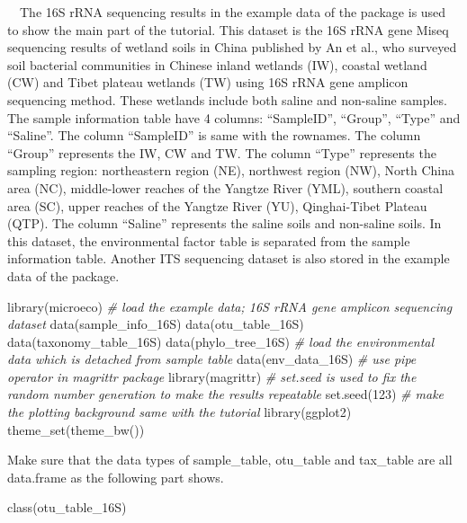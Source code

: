 \documentclass[
]{book}
\newenvironment{Shaded}{\begin{snugshade}}{\end{snugshade}}
\newcommand{\CommentTok}[1]{\textcolor[rgb]{0.56,0.35,0.01}{\textit{#1}}}
\newcommand{\DecValTok}[1]{\textcolor[rgb]{0.00,0.00,0.81}{#1}}
\newcommand{\FunctionTok}[1]{\textcolor[rgb]{0.00,0.00,0.00}{#1}}
\newcommand{\NormalTok}[1]{#1}
\begin{document}
　The 16S rRNA sequencing results in the example data of the package is used to show the main part of the tutorial.
This dataset is the 16S rRNA gene Miseq sequencing results of wetland soils in China published by An et al.\citep{An_Soil_2019},
who surveyed soil bacterial communities in Chinese inland wetlands (IW),
coastal wetland (CW) and Tibet plateau wetlands (TW) using 16S rRNA gene amplicon sequencing method.
These wetlands include both saline and non-saline samples.
The sample information table have 4 columns: ``SampleID'', ``Group'', ``Type'' and ``Saline''.
The column ``SampleID'' is same with the rownames.
The column ``Group'' represents the IW, CW and TW.
The column ``Type'' represents the sampling region: northeastern region (NE), northwest region (NW), North China area (NC),
middle-lower reaches of the Yangtze River (YML), southern coastal area (SC), upper reaches of the Yangtze River (YU), Qinghai-Tibet Plateau (QTP).
The column ``Saline'' represents the saline soils and non-saline soils.
In this dataset, the environmental factor table is separated from the sample information table.
Another ITS sequencing dataset is also stored in the example data of the package\citep{Gao_Strong_2019}.

\begin{Shaded}
\begin{Highlighting}[]
\FunctionTok{library}\NormalTok{(microeco)}
\CommentTok{\# load the example data; 16S rRNA gene amplicon sequencing dataset}
\FunctionTok{data}\NormalTok{(sample\_info\_16S)}
\FunctionTok{data}\NormalTok{(otu\_table\_16S)}
\FunctionTok{data}\NormalTok{(taxonomy\_table\_16S)}
\FunctionTok{data}\NormalTok{(phylo\_tree\_16S)}
\CommentTok{\# load the environmental data which is detached from sample table}
\FunctionTok{data}\NormalTok{(env\_data\_16S)}
\CommentTok{\# use pipe operator in magrittr package}
\FunctionTok{library}\NormalTok{(magrittr)}
\CommentTok{\# set.seed is used to fix the random number generation to make the results repeatable}
\FunctionTok{set.seed}\NormalTok{(}\DecValTok{123}\NormalTok{)}
\CommentTok{\# make the plotting background same with the tutorial}
\FunctionTok{library}\NormalTok{(ggplot2)}
\FunctionTok{theme\_set}\NormalTok{(}\FunctionTok{theme\_bw}\NormalTok{())}
\end{Highlighting}
\end{Shaded}

Make sure that the data types of sample\_table, otu\_table and tax\_table are all data.frame as the following part shows.

\begin{Shaded}
\begin{Highlighting}[]
\FunctionTok{class}\NormalTok{(otu\_table\_16S)}
\end{Highlighting}
\end{Shaded}
\end{document}
